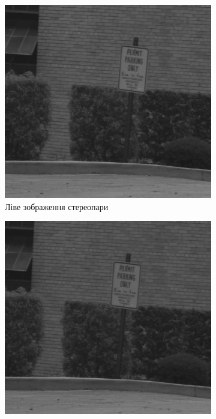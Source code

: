 \begin{figure}[h]
  \centering
  \begin{subfigure}[b]{0.45\textwidth}
      \includegraphics[width=\textwidth]{images/overview_cox_dynamic_left}
      \caption{Ліве зображення стереопари}
  \end{subfigure}
  \hfill
  \begin{subfigure}[b]{0.45\textwidth}
      \includegraphics[width=\textwidth]{images/overview_cox_dynamic_right}

\end{subfigure}
\end{figure}
